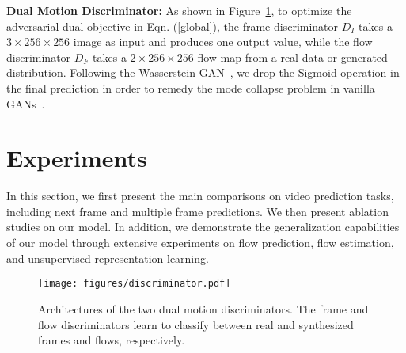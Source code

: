 \documentclass[10pt,twocolumn,letterpaper]{article}
\begin{document}
	\textbf{Dual Motion Discriminator:}
	As shown in Figure~\ref{fig:discriminator}, to optimize the adversarial dual objective in Eqn. (\ref{global}), the frame discriminator $D_I$ takes a $3\times256\times256$ image as input and produces one output value, while the flow discriminator $D_F$ takes a $2\times256\times256$ flow map from a real data or generated distribution. Following the Wasserstein GAN~\cite{arjovsky2017wasserstein}, we drop the Sigmoid operation in the final prediction in order to remedy the mode collapse problem in vanilla GANs~\cite{goodfellow2014generative}.
	

	\section{Experiments}
	In this section, we first present the main comparisons on video prediction tasks, including next frame and multiple frame predictions. We then present ablation studies on our model. In addition, we demonstrate the generalization capabilities of our model through extensive experiments on flow prediction, flow estimation, and unsupervised representation learning.
	
		\begin{figure}[!tp]
			\begin{center}
			\texttt{[image: figures/discriminator.pdf]}
				\caption{Architectures of the two dual motion discriminators. The frame and flow discriminators learn to classify between real and synthesized frames and flows, respectively.}
				\label{fig:discriminator}
			\end{center}
			\vspace{-8mm}
		\end{figure}
		
\end{document}
